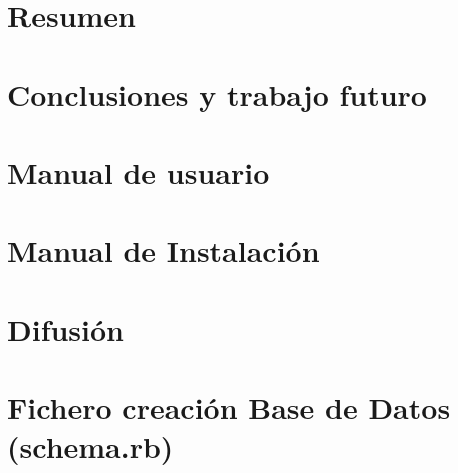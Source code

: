 \documentclass[a4paper,11pt]{book}
\begin{document}
\chapter{Resumen}
\label{cap:resumen}


\chapter{Conclusiones y trabajo futuro}
\label{cap:conclusiones}


\appendix
\cleardoublepage
\addappheadtotoc
\appendixpage
\chapter{Manual de usuario}
\label{cap:man_usuario}

\chapter{Manual de Instalación}
\label{cap:man_instalacion}

\chapter{Difusión}
\label{cap:difusion}


\chapter{Fichero creación Base de Datos (schema.rb)}
\label{cap:schema}


\backmatter

\cleardoublepage
{}
{}




\end{document}
